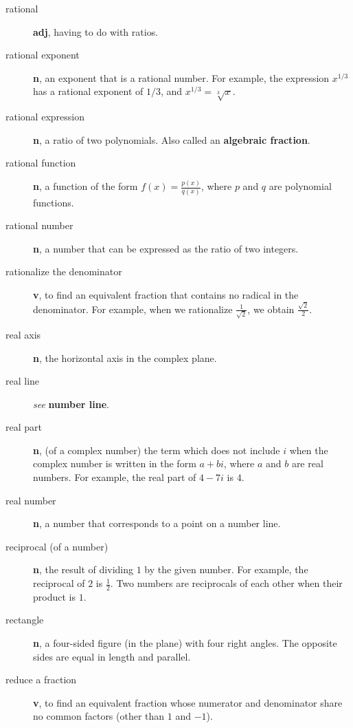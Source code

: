 \documentclass[10pt,]{book}
\newcommand{\terminology}[1]{\textbf{#1}}
\theoremstyle{plain}
\theoremstyle{definition}
\theoremstyle{definition}
\theoremstyle{definition}
\numberwithin{equation}{part}
\begin{document}
\begin{description}
\item[{rational}]\hypertarget{li-763}{}\terminology{adj}, having to do with ratios.%
\item[{rational exponent}]\hypertarget{li-764}{}\terminology{n}, an exponent that is a rational number. For example, the expression \(x^{1/3}\) has a rational exponent of \(1/3\), and \(x^{1/3} = \sqrt[3]{x}\).%
\item[{rational expression}]\hypertarget{li-765}{}\terminology{n}, a ratio of two polynomials. Also called an \terminology{algebraic fraction}.%
\item[{rational function}]\hypertarget{li-766}{}\terminology{n}, a function of the form \(f (x) = \frac{p(x)}{q(x)}\), where \(p\) and \(q\) are polynomial functions.%
\item[{rational number}]\hypertarget{li-767}{}\terminology{n}, a number that can be expressed as the ratio of two integers.%
\item[{rationalize the denominator}]\hypertarget{li-768}{}\terminology{v}, to find an equivalent fraction that contains no radical in the denominator. For example, when we rationalize \(\frac{1}{\sqrt{2}} \), we obtain \(\frac{\sqrt{2}}{2} \).%
\item[{real axis}]\hypertarget{li-769}{}\terminology{n}, the horizontal axis in the complex plane.%
\item[{real line}]\hypertarget{li-770}{}\emph{see} \terminology{number line}.%
\item[{real part}]\hypertarget{li-771}{}\terminology{n}, (of a complex number) the term which does not include \(i\) when the complex number is written in the form \(a + bi\), where \(a\) and \(b\) are real numbers. For example, the real part of \(4 − 7i\) is \(4\).%
\item[{real number}]\hypertarget{li-772}{}\terminology{n}, a number that corresponds to a point on a number line.%
\item[{reciprocal (of a number)}]\hypertarget{li-773}{}\terminology{n}, the result of dividing \(1\) by the given number. For example, the reciprocal of \(2\) is \(\frac{1}{2} \). Two numbers are reciprocals of each other when their product is \(1\).%
\item[{rectangle}]\hypertarget{li-774}{}\terminology{n}, a four-sided figure (in the plane) with four right angles. The opposite sides are equal in length and parallel.%
\item[{reduce a fraction}]\hypertarget{li-775}{}\terminology{v}, to find an equivalent fraction whose numerator and denominator share no common factors (other than \(1\) and \(-1\)).%

\end{description}
\end{document}
